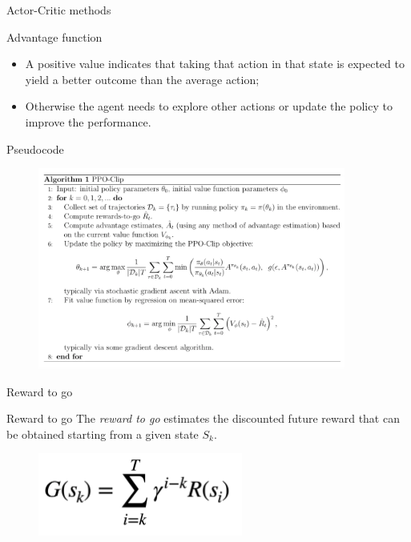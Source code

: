 \documentclass[presentation]{beamer}\mode<presentation>{\usetheme{AMSBolognaFC}}
\begin{document}
\begin{frame}[allowframebreaks]{Actor-Critic methods}
\begin{exampleblock}{Advantage function}
	\begin{itemize}
		\item A positive value indicates that  taking that action in that state is expected to yield a better
			outcome than the average action;
		\item Otherwise the agent needs to explore 
			other actions or update the policy to improve the performance.
	\end{itemize}
\end{exampleblock}

\end{frame}

\begin{frame}{Pseudocode}
\begin{figure}
	\includegraphics[width=0.9\textwidth]{img/PPO-pseudocode.pdf}
\end{figure}
\end{frame}

\begin{frame}{Reward to go}

\begin{block}{Reward to go}
	The \emph{reward to go} estimates the discounted future reward that can be obtained 
		starting from a given state $S_k$.
\end{block}

\begin{figure}
	\includegraphics[width=0.6\textwidth]{img/reward-to-go.pdf}
\end{figure}	
\end{frame}
\end{document}

